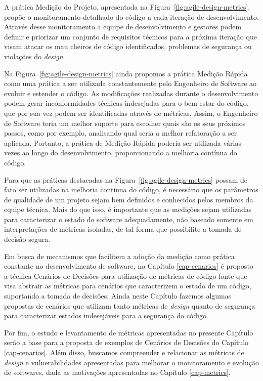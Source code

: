 %

A prática Medição do Projeto, apresentada na Figura~\ref{fig:agile-design-metrics}, propõe o monitoramento detalhado do código a cada iteração de desenvolvimento. Através desse monitoramento a equipe de desenvolvimento e gestores podem definir e priorizar um conjunto de requisitos técnicos para a próxima iteração que visam atacar os mau cheiros de código identificados, problemas de segurança ou violações do \emph{design}.

%

Na Figura~\ref{fig:agile-design-metrics} ainda propomos a prática Medição Rápida como uma prática a ser utilizada constantemente pelo Engenheiro de Software ao evoluir e estender o código. As modificações realizadas durante o desenvolvimento podem gerar inconformidades técnicas indesejadas para o bem estar do código, que por sua vez podem ser identificadas através de métricas. Assim, o Engenheiro de Software teria um melhor suporte para escolher quais são os seus próximos passos, como por exemplo, analisando qual seria a melhor refatoração a ser aplicada. Portanto, a prática de Medição Rápida poderia ser utilizada várias vezes ao longo do desenvolvimento, proporcionando a melhoria contínua do código.

%

Para que as práticas destacadas na Figura~\ref{fig:agile-design-metrics} possam de fato ser utilizadas na melhoria contínua do código, é necessário que os parâmetros de qualidade de um projeto sejam bem definidos e conhecidos pelos membros da equipe técnica. Mais do que isso, é importante que as medições sejam utilizadas para caracterizar o estado do software adequadamente, não baseado somente em interpretações de métricas isoladas, de tal forma que possibilite a tomada de decisão segura.

%


Em busca de mecanismos que facilitem a adoção da medição como prática constante no desenvolvimento de software, no Capítulo \ref{cap-cenarios} é proposto a técnica Cenários de Decisões para utilização de métricas de código-fonte que visa abstrair as métricas para cenários que caracterizem o estado de um código, suportando a tomada de decisões. Ainda neste Capítulo fazemos algumas propostas de cenários que utilizam tanto métricas de \emph{design} quanto de segurança para caracterizar estados indesejáveis para a segurança do código.

%

Por fim, o estudo e levantamento de métricas apresentadas no presente Capítulo serão a base para a proposta de exemplos de Cenários de Decisões do Capítulo \ref{cap-cenarios}. Além disso, buscamos compreender e relacionar as métricas de \emph{design} e vulnerabilidades apresentadas para melhorar o monitoramento e evolução de softwares, dada as motivações apresentadas no Capítulo \ref{cap-metrics}.

%